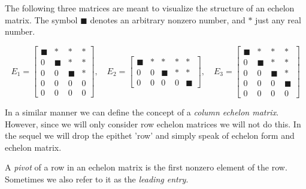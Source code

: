 \begin{ex}
\label{Ex:LinSystems:EchelonForm}
The following three matrices are meant to visualize the structure of an echelon matrix. 
The symbol  $\blacksquare$ denotes an arbitrary nonzero number, and  $\ast$ just any real number. 

$$

  E_1 = 
\begin{bmatrix} \blacksquare & \ast & \ast &  \ast \\  
                         0  & \blacksquare & \ast & \ast \\
                         0  &  0 &\blacksquare &  \ast \\ 
                         0  & 0 & 0 &  0 \\
                         0  & 0 & 0 &  0  \end{bmatrix} , 
                   \quad
  E_2 =   
\begin{bmatrix} \blacksquare & \ast & \ast & \ast & \ast \\  
                         0  & 0 & \blacksquare &  \ast & \ast \\
                         0  & 0 & 0 &0 & \blacksquare  \end{bmatrix}, 
                         \quad
  E_3 =   
\begin{bmatrix} \blacksquare & \ast &  \ast & \ast \\  
                         0  & \blacksquare & \ast & \ast \\
                         0  & 0 & \blacksquare &   \ast \\
                         0  & 0 & 0  & \blacksquare  \\
                         0  & 0  &0  & 0  \end{bmatrix}                       
$$

\end{ex}




In a similar manner we can define the concept of a \emph{column echelon matrix}.
However, since we will only consider row echelon matrices we will not do this. In the sequel we will drop the epithet 'row'  and simply speak of echelon form and echelon matrix.


\begin{dfn}
\label{Dfn:LinSystems:Pivot}
A \emph{pivot} of a row in an echelon matrix is the first nonzero element of the row. Sometimes we also refer to it as the \emph{leading entry}.
\end{dfn}


